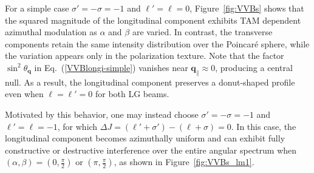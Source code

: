 For a simple case $\sigma'=-\sigma=-1$ and $\ell'=\ell=0$, Figure~\ref{fig:VVBs} shows that the squared magnitude of the longitudinal component exhibits TAM dependent azimuthal modulation as $\alpha$ and $\beta$ are varied. In contrast, the transverse components retain the same intensity distribution over the Poincar\'e sphere, while the variation appears only in the polarization texture. Note that the factor $\sin^2\theta_{\boldsymbol{q}}$ in Eq.~(\ref{VVBlongi-simple}) vanishes near $\boldsymbol{q}_\parallel\approx0$, producing a central null. As a result, the longitudinal component preserves a donut-shaped profile even when $\ell=\ell'=0$ for both LG beams.


Motivated by this behavior, one may instead choose $\sigma'=-\sigma=-1$ and $\ell'=\ell=-1$, for which $\Delta J=(\ell'+\sigma')-(\ell+\sigma)=0$. In this case, the longitudinal component becomes azimuthally uniform and can exhibit fully constructive or destructive interference over the entire angular spectrum when $(\alpha,\beta)=\left(0,\frac{\pi}{2}\right)$ or $\left(\pi,\frac{\pi}{2}\right)$, as shown in Figure~\ref{fig:VVBs_lm1}.















